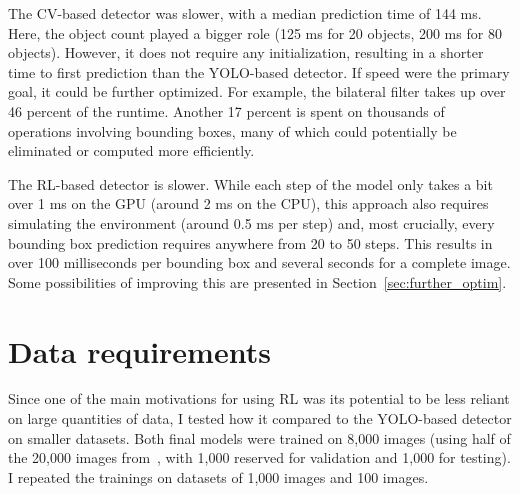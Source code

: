 \documentclass[
  digital,     %
  oneside,     %
  nosansbold,  %
  nocolorbold, %
  lof,         %
  lot,         %
]{fithesis4}
\begin{document}
The CV-based detector was slower, with a median prediction time of 144 ms. Here, the object count played a bigger role (125 ms for 20 objects, 200 ms for 80 objects). However, it does not require any initialization, resulting in a shorter time to first prediction than the YOLO-based detector. If speed were the primary goal, it could be further optimized. For example, the bilateral filter takes up over 46 percent of the runtime. Another 17 percent is spent on thousands of operations involving bounding boxes, many of which could potentially be eliminated or computed more efficiently.

The RL-based detector is slower. While each step of the model only takes a bit over 1 ms on the GPU (around 2 ms on the CPU), this approach also requires simulating the environment (around 0.5 ms per step) and, most crucially, every bounding box prediction requires anywhere from 20 to 50 steps. This results in over 100 milliseconds per bounding box and several seconds for a complete image. Some possibilities of improving this are presented in Section~\ref{sec:further_optim}.


\section{Data requirements}
\label{sec:data_req}

Since one of the main motivations for using RL was its potential to be less reliant on large quantities of data, I tested how it compared to the YOLO-based detector on smaller datasets. Both final models were trained on 8,000 images (using half of the 20,000 images from~\cite{aydos2020}, with 1,000 reserved for validation and 1,000 for testing). I repeated the trainings on datasets of 1,000 images and 100 images.
\end{document}
